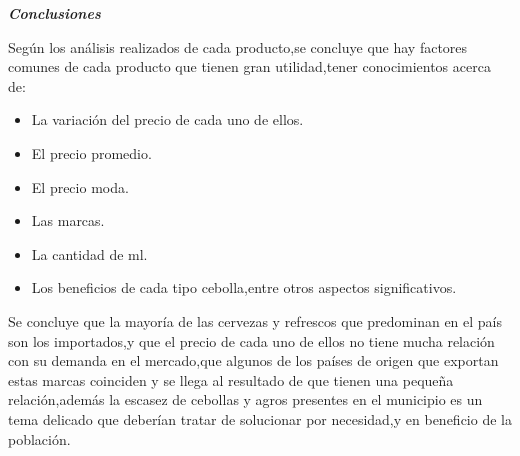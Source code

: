 \documentclass[10pt]{beamer}
\begin{document}
   	
   	\begin{frame}{\textbf{\textit{Conclusiones}}}
   		
   		Según los análisis realizados de cada producto,se concluye que hay factores comunes de cada producto que tienen gran utilidad,tener conocimientos acerca de:
   		
   		\begin{itemize}
   			\item{La variación del precio de cada uno de ellos.}
   			\item{El precio promedio.}
   			\item{El precio moda.}
   			\item{Las marcas.}
   			\item{ La cantidad de ml.}
   			\item{Los beneficios de cada tipo cebolla,entre otros aspectos significativos.}
   		\end{itemize}
   		
   		  Se concluye que la  mayoría de las cervezas y refrescos que predominan en el país son los importados,y que el precio de cada uno de ellos no tiene mucha relación con su demanda en el mercado,que algunos de los países de origen que exportan estas marcas coinciden y se llega al resultado de que tienen una pequeña relación,además la escasez de cebollas y agros presentes en el municipio es un tema delicado que deberían tratar de solucionar por necesidad,y en beneficio de la población.
   		
   	\end{frame}
   	
  
\end{document}
